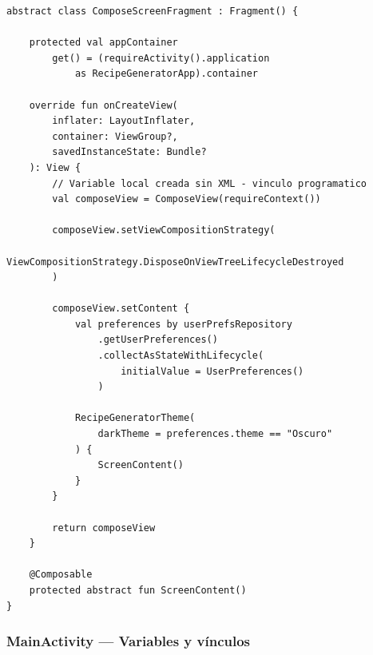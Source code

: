 \documentclass[stu, 12pt, letterpaper, donotrepeattitle, floatsintext, natbib]{apa7}
\begin{document}
\begin{lstlisting}[caption={Vínculo programático en ComposeScreenFragment.kt}]
abstract class ComposeScreenFragment : Fragment() {

    protected val appContainer
        get() = (requireActivity().application
            as RecipeGeneratorApp).container

    override fun onCreateView(
        inflater: LayoutInflater,
        container: ViewGroup?,
        savedInstanceState: Bundle?
    ): View {
        // Variable local creada sin XML - vinculo programatico
        val composeView = ComposeView(requireContext())

        composeView.setViewCompositionStrategy(
            ViewCompositionStrategy.DisposeOnViewTreeLifecycleDestroyed
        )

        composeView.setContent {
            val preferences by userPrefsRepository
                .getUserPreferences()
                .collectAsStateWithLifecycle(
                    initialValue = UserPreferences()
                )

            RecipeGeneratorTheme(
                darkTheme = preferences.theme == "Oscuro"
            ) {
                ScreenContent()
            }
        }

        return composeView
    }

    @Composable
    protected abstract fun ScreenContent()
}
\end{lstlisting}

\subsubsection{MainActivity --- Variables y vínculos}
\end{document}
